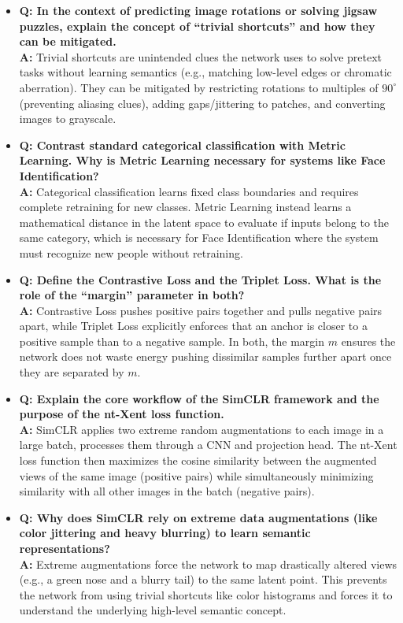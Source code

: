 \begin{itemize}
    \item \textbf{Q: In the context of predicting image rotations or solving jigsaw puzzles, explain the concept of ``trivial shortcuts'' and how they can be mitigated.} \\
    \textbf{A:} Trivial shortcuts are unintended clues the network uses to solve pretext tasks without learning semantics (e.g., matching low-level edges or chromatic aberration). They can be mitigated by restricting rotations to multiples of $90^\circ$ (preventing aliasing clues), adding gaps/jittering to patches, and converting images to grayscale.
    
    \item \textbf{Q: Contrast standard categorical classification with Metric Learning. Why is Metric Learning necessary for systems like Face Identification?} \\
    \textbf{A:} Categorical classification learns fixed class boundaries and requires complete retraining for new classes. Metric Learning instead learns a mathematical distance in the latent space to evaluate if inputs belong to the same category, which is necessary for Face Identification where the system must recognize new people without retraining.
    
    \item \textbf{Q: Define the Contrastive Loss and the Triplet Loss. What is the role of the ``margin'' parameter in both?} \\
    \textbf{A:} Contrastive Loss pushes positive pairs together and pulls negative pairs apart, while Triplet Loss explicitly enforces that an anchor is closer to a positive sample than to a negative sample. In both, the margin $m$ ensures the network does not waste energy pushing dissimilar samples further apart once they are separated by $m$.
    
    \item \textbf{Q: Explain the core workflow of the SimCLR framework and the purpose of the nt-Xent loss function.} \\
    \textbf{A:} SimCLR applies two extreme random augmentations to each image in a large batch, processes them through a CNN and projection head. The nt-Xent loss function then maximizes the cosine similarity between the augmented views of the same image (positive pairs) while simultaneously minimizing similarity with all other images in the batch (negative pairs).
    
    \item \textbf{Q: Why does SimCLR rely on extreme data augmentations (like color jittering and heavy blurring) to learn semantic representations?} \\
    \textbf{A:} Extreme augmentations force the network to map drastically altered views (e.g., a green nose and a blurry tail) to the same latent point. This prevents the network from using trivial shortcuts like color histograms and forces it to understand the underlying high-level semantic concept.
\end{itemize}

